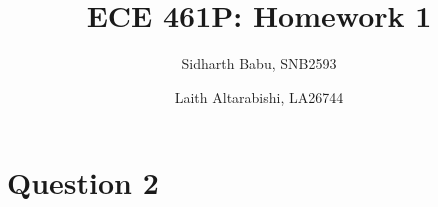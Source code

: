\documentclass{article}
\author{Sidharth Babu, SNB2593 \and Laith Altarabishi, LA26744 }
\title{ECE 461P: Homework 1}
\begin{document}
\begin{mdframed}
    \maketitle
\end{mdframed}
\pagebreak

\section{Question 2}
\end{document}
